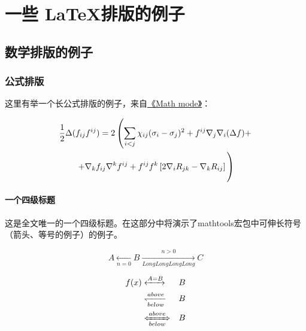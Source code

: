 
\chapter{一些 \LaTeX 排版的例子}
\label{chap:example}

\section{数学排版的例子}
\label{sec:matheq}

\subsection{公式排版}
\label{sec:eqformat}

这里有举一个长公式排版的例子，来自\href{http://www.tex.ac.uk/tex-archive/info/math/voss/mathmode/Mathmode.pdf}{《Math mode》}：

\begin {multline}
  \frac {1}{2}\Delta (f_{ij}f^{ij})=
  2\left (\sum _{i<j}\chi _{ij}(\sigma _{i}-
    \sigma _{j}) ^{2}+ f^{ij}\nabla _{j}\nabla _{i}(\Delta f)+\right .\\
  \left .+\nabla _{k}f_{ij}\nabla ^{k}f^{ij}+
    f^{ij}f^{k}\left [2\nabla _{i}R_{jk}-
      \nabla _{k}R_{ij}\right ]\vphantom {\sum _{i<j}}\right )
\end{multline}

\subsubsection{一个四级标题}
\label{sec:depth4}

这是全文唯一的一个四级标题。在这部分中将演示了mathtools宏包中可伸长符号（箭头、等号的例子）的例子。

\begin{displaymath}
    A \xleftarrow[n=0]{} B \xrightarrow[LongLongLongLong]{n>0} C 
\end{displaymath}

\begin{eqnarray}
  f(x) & \xleftrightarrow[]{A=B}  & B \\
  & \xleftharpoondown[below]{above} & B \nonumber \\
  & \xLeftrightarrow[below]{above} & B
\end{eqnarray}

